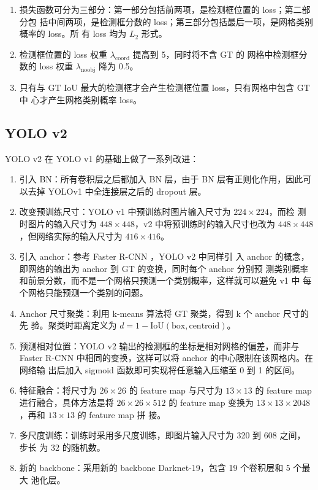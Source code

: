 \begin{enumerate}
  \item 损失函数可分为三部分：第一部分包括前两项，是检测框位置的 loss；第二部分包
    括中间两项，是检测框分数的 loss；第三部分包括最后一项，是网格类别概率的 loss。所
    有 loss 均为 $L_2$ 形式。
  \item 检测框位置的 loss 权重 $\lambda_{\mathrm{coord}}$ 提高到 5，同时将不含 GT 的
    网格中检测框分数的 loss 权重 $\lambda_{\mathrm{noobj}}$ 降为 0.5。
  \item 只有与 GT IoU 最大的检测框才会产生检测框位置 loss，只有网格中包含 GT 中
    心才产生网格类别概率 loss。
\end{enumerate}

\subsection{YOLO v2}
\label{subsec:YOLOv2}
YOLO v2 在 YOLO v1 的基础上做了一系列改进：

\begin{enumerate}
  \item 引入 BN：所有卷积层之后都加入 BN 层，由于 BN 层有正则化作用，因此可以去掉
    YOLOv1 中全连接层之后的 dropout 层。
  \item 改变预训练尺寸：YOLO v1 中预训练时图片输入尺寸为 $224 \times 224$，而检
    测时图片的输入尺寸为 $448 \times 448$，v2 中将预训练时的输入尺寸也改为 $448
    \times 448$，但网络实际的输入尺寸为 $416 \times 416$。
  \item 引入 anchor：参考 Faster R-CNN \cite{2015-Faster-RCNN}，YOLO v2 中同样引
    入 anchor 的概念，即网络的输出为 anchor 到 GT 的变换，同时每个 anchor 分别预
    测类别概率和前景分数，而不是一个网格只预测一个类别概率，这样就可以避免 v1 中
    每个网格只能预测一个类别的问题。
  \item Anchor 尺寸聚类：利用 k-means 算法将 GT 聚类，得到 k 个 anchor 尺寸的先
    验。聚类时距离定义为 $d = 1 - \mathrm{IoU}(\mathrm{box}, \mathrm{centroid})$。
  \item 预测相对位置：YOLO v2 输出的检测框的坐标是相对网格的偏差，而非与
    Faster R-CNN 中相同的变换，这样可以将 anchor 的中心限制在该网格内。在网络输
    出后加入 sigmoid 函数即可实现将任意输入压缩至 0 到 1 的区间。
  \item 特征融合：将尺寸为 $26 \times 26$ 的 feature map 与尺寸为 $13 \times 13$
    的 feature map 进行融合，具体方法是将 $26 \times 26 \times 512$ 的 feature
    map 变换为 $13 \times 13 \times 2048$，再和 $13 \times 13$ 的 feature map 拼
    接。
  \item 多尺度训练：训练时采用多尺度训练，即图片输入尺寸为 320 到 608 之间，步长
    为 32 的随机数。
  \item 新的 backbone：采用新的 backbone Darknet-19，包含 19 个卷积层和 5 个最大
    池化层。
\end{enumerate}

